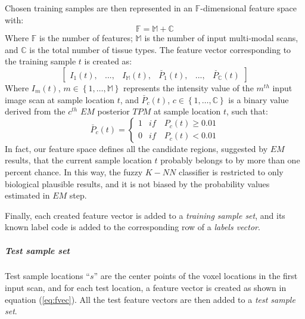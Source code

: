 Chosen training samples are then represented in an $\mathbb{F}$-dimensional feature space with:
\begin{equation}
\mathbb{F}=\mathbb{M}+\mathbb{C}
\end{equation}
Where $\mathbb{F}$ is the number of features; $\mathbb{M}$ is the number of input multi-modal scans, and $\mathbb{C}$ is the total number of tissue types.
The feature vector corresponding to the training sample $t$ is created as:
\begin{equation} \label{eq:fvec}
\begin{bmatrix}
I_{1}(t), & ..., & I_{\mathbb{M}}(t), & \breve{P_1}(t), & ..., & \breve{P_{\mathbb{C}}}(t)
\end{bmatrix}
\end{equation}
Where $I_{m}(t)$, $m\in \left\{1,\ldots, \mathbb{M}\right\}$ represents the intensity value of the $m^{th}$ input image scan at sample location $t$, and $\breve{P_c}(t)$, $c\in \left\{1,\ldots, \mathbb{C}\right\}$ is a binary value derived from the $c^{th}$ $EM$ posterior $TPM$ at sample location $t$, such that:
\begin{equation}
\breve{P_c}(t) = \left\{\begin{matrix}
1 & if \quad P_c(t) \geq 0.01 \\ 
0 & if \quad P_c(t) <  0.01
\end{matrix}\right.
\end{equation}
In fact, our feature space defines all the candidate regions, suggested by $EM$ results, that the current sample location $t$ probably belongs to by more than one percent chance. In this way, the fuzzy $K-NN$ classifier is restricted to only biological plausible results, and it is not biased by the probability values estimated in $EM$ step.

Finally, each created feature vector is added to a \textit{training sample set},
and its known label code is added to the corresponding row of a \textit{labels vector}.

\subparagraph*{Test sample set} %

Test sample locations ``$s$'' are the center points of the voxel locations in the first input scan, and for each test location, a feature vector is created as shown in equation (\ref{eq:fvec}). All the test feature vectors are then added to a \textit{test sample set}.


